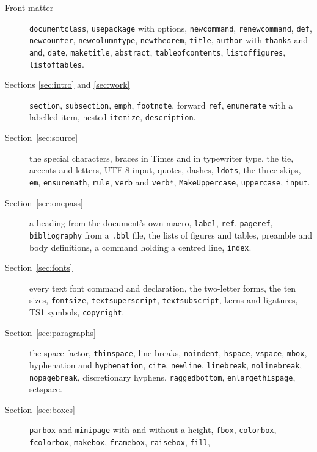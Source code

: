 \documentclass{article}
\numberwithin{equation}{section}
\theoremstyle{definition}
\theoremstyle{remark}
\begin{document}
\begin{description}
  \item[Front matter] \texttt{documentclass}, \texttt{usepackage} with options,
        \texttt{newcommand}, \texttt{renewcommand}, \texttt{def}, \texttt{newcounter},
        \texttt{newcolumntype}, \texttt{newtheorem}, \texttt{title}, \texttt{author} with
        \texttt{thanks} and \texttt{and}, \texttt{date}, \texttt{maketitle},
        \texttt{abstract}, \texttt{tableofcontents}, \texttt{listoffigures},
        \texttt{listoftables}.
  \item[Sections \ref{sec:intro} and \ref{sec:work}] \texttt{section},
        \texttt{subsection}, \texttt{emph}, \texttt{footnote}, forward \texttt{ref},
        \texttt{enumerate} with a labelled item, nested \texttt{itemize},
        \texttt{description}.
  \item[Section~\ref{sec:source}] the special characters, braces in Times and in
        typewriter type, the tie, accents and letters, UTF-8 input, quotes, dashes,
        \texttt{ldots}, the three skips, \texttt{em}, \texttt{ensuremath}, \texttt{rule},
        \texttt{verb} and \texttt{verb*}, \texttt{MakeUppercase}, \texttt{uppercase},
        \texttt{input}.
  \item[Section~\ref{sec:onepass}] a heading from the document's own macro,
        \texttt{label}, \texttt{ref}, \texttt{pageref}, \texttt{bibliography} from a
        \texttt{.bbl} file, the lists of figures and tables, preamble and body
        definitions, a command holding a centred line, \texttt{index}.
  \item[Section~\ref{sec:fonts}] every text font command and declaration, the
        two-letter forms, the ten sizes, \texttt{fontsize}, \texttt{textsuperscript},
        \texttt{textsubscript}, kerns and ligatures, TS1 symbols, \texttt{copyright}.
  \item[Section~\ref{sec:paragraphs}] the space factor, \texttt{thinspace}, line breaks,
        \texttt{noindent}, \texttt{hspace}, \texttt{vspace}, \texttt{mbox},
        hyphenation and \texttt{hyphenation}, \texttt{cite}, \texttt{newline},
        \texttt{linebreak}, \texttt{nolinebreak}, \texttt{nopagebreak}, discretionary
        hyphens, \texttt{raggedbottom}, \texttt{enlargethispage}, setspace.
  \item[Section~\ref{sec:boxes}] \texttt{parbox} and \texttt{minipage} with and
        without a height, \texttt{fbox}, \texttt{colorbox}, \texttt{fcolorbox},
        \texttt{makebox}, \texttt{framebox}, \texttt{raisebox}, \texttt{fill},

\end{description}
\end{document}
